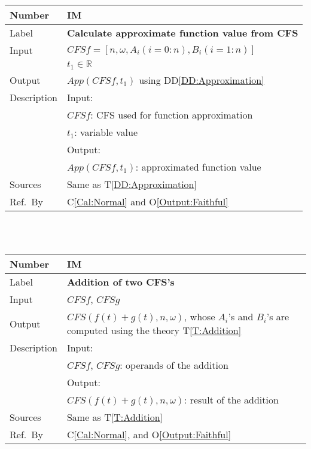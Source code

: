 \documentclass[12pt]{article}
\newcommand{\colAwidth}{0.13\textwidth}
\newcommand{\colBwidth}{0.82\textwidth}
\newcommand{\ddref}[1]{DD\ref{#1}}
\newcommand{\tref}[1]{T\ref{#1}}
\newcounter{instnum} %
\newcommand{\calref}[1]{C\ref{#1}}
\newcommand{\oref}[1]{O\ref{#1}}
\begin{document}
\noindent
\begin{minipage}{\textwidth}
	\renewcommand*{\arraystretch}{1.5}
	\begin{tabular}{| p{\colAwidth} | p{\colBwidth}|}
		\hline
		\rowcolor[gray]{0.9}
		Number& IM{instnum}\theinstnum 
		\label{IM:Approximation}\\
		\hline
		Label& \bf Calculate approximate function value from CFS\\
		\hline
		Input& $\mathit{CFSf}=[n, \omega, A_i(i=0:n), B_i(i=1:n)]$\\
		&$t_1\in\mathbb{R}$\\
		\hline
		Output& $\mathit{App}(\mathit{CFSf}, t_1)$ using \ddref{DD:Approximation}\\
		\hline
		Description&Input:\\
		&$CFSf$: CFS used for function approximation\\
		& $t_1$: variable value\\
		&Output:\\
		&$\mathit{App}(\mathit{CFSf}, t_1)$: approximated function value\\ 
		\hline
		Sources&Same as \tref{DD:Approximation}		\\
		\hline
		Ref.\ By & 
		\calref{Cal:Normal} and
		\oref{Output:Faithful}\\
		\hline
	\end{tabular}
\end{minipage}\\
~\newline


\noindent
\begin{minipage}{\textwidth}
	\renewcommand*{\arraystretch}{1.5}
	\begin{tabular}{| p{\colAwidth} | p{\colBwidth}|}
		\hline
		\rowcolor[gray]{0.9}
		Number& IM{instnum}\theinstnum 
		\label{IM:Addition}\\
		\hline
		Label& \bf Addition of two CFS's \\
		\hline
		Input& $\mathit{CFSf}$, $\mathit{CFSg}$\\
		\hline
		Output& $\mathit{CFS}(f(t)+g(t), n, \omega)$, whose $A_i$'s 
		and $B_i$'s are computed using the theory \tref{T:Addition}\\
		\hline
		Description&Input:\\
		&$\mathit{CFSf}$, $\mathit{CFSg}$: operands of the addition\\
		&Output:\\
		& $\mathit{CFS}(f(t)+g(t), n, \omega)$: result of the addition\\
		\hline
		Sources&Same as \tref{T:Addition}		\\
		\hline
		Ref.\ By &  \calref{Cal:Normal}, 
		and \oref{Output:Faithful}\\
		\hline
	\end{tabular}
\end{minipage}\\
~\newline
\end{document}
